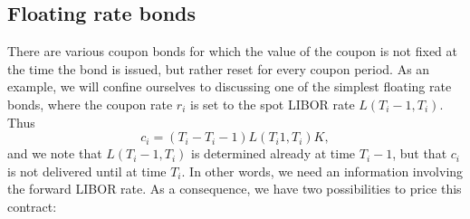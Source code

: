 \subsection{Floating rate bonds}
There are various coupon bonds for which the value of the coupon is not fixed at the time the bond is issued, but rather reset for every coupon period. As an example, we will confine ourselves to discussing one of the simplest floating rate bonds, where the coupon rate $r_i$ is set to the spot LIBOR rate $L(T_i-1,T_i)$. Thus
\begin{equation*}
    c_i = (T_i - T_i-1)L(T_i1, T_i)K,
\end{equation*}
and we note that $L(T_i-1,T_i)$ is determined already at time $T_i-1$, but that $c_i$ is not delivered until at time $T_i$. In other words, we need an information involving the forward LIBOR rate. As a consequence, we have two possibilities to price this contract:
